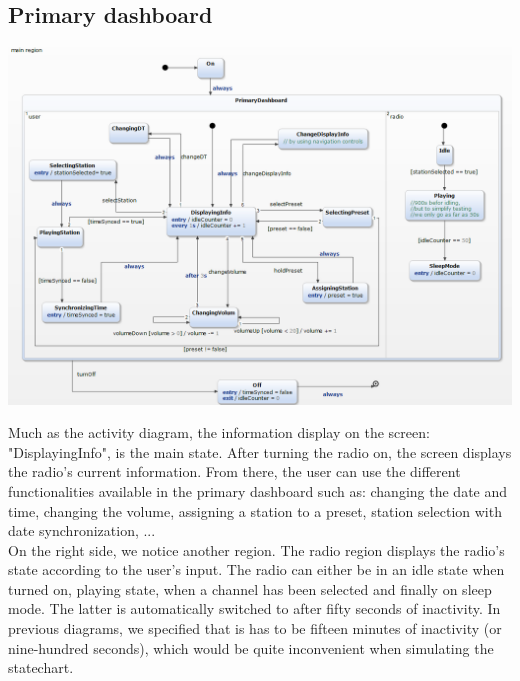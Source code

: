 \documentclass[11pt]{article}
\begin{document}
\subsection{Primary dashboard}
\vspace{10px}
\begin{center}
\includegraphics[width=15cm]{../Diagrams/statechartPrimaryD-v2.png}\\
\end{center}
Much as the activity diagram, the information display on the screen: "DisplayingInfo", is the main state. After turning the radio on, the screen displays the radio's current information. From there, the user can use the different functionalities available in the primary dashboard such as: changing the date and time, changing the volume, assigning a station to a preset, station selection with date synchronization, ...\\
On the right side, we notice another region. The radio region displays the radio's state according to the user's input. The radio can either be in an idle state when turned on, playing state, when a channel has been selected and finally on sleep mode. The latter is automatically switched to after fifty seconds of inactivity. In previous diagrams, we specified that is has to be fifteen minutes of inactivity (or nine-hundred seconds), which would be quite inconvenient when simulating the statechart.
\end{document}
